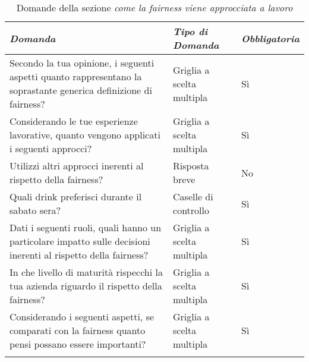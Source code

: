 \begin{longtable}{| p{} | p{} | p{} |} 
\hline\textbf{\textit{Domanda}} & \textbf{\textit{Tipo di Domanda}} & \textbf{\textit{Obbligatoria}}\\
\hline
\endhead 

\hline 
Secondo la tua opinione, i seguenti aspetti quanto rappresentano la soprastante generica definizione di fairness?

& Griglia a scelta multipla

& Sì 

\\ \hline
\rowcolor{Gray!30}
Considerando le tue esperienze lavorative, quanto vengono applicati i seguenti approcci?

& Griglia a scelta multipla

& Sì 

\\ \hline

Utilizzi altri approcci inerenti al rispetto della fairness?   

&  Risposta breve

& No

\\ \hline
\rowcolor{Gray!30}
Quali drink preferisci durante il sabato sera?

&  Caselle di controllo

& Sì

\\ \hline 
Dati i seguenti ruoli, quali hanno un particolare impatto sulle decisioni inerenti al rispetto della fairness?

& Griglia a scelta multipla

& Sì 

\\ \hline
\rowcolor{Gray!30}
In che livello di maturità rispecchi la tua azienda riguardo il rispetto della fairness?

& Griglia a scelta multipla

& Sì 

\\ \hline
Considerando i seguenti aspetti, se comparati con la fairness quanto pensi possano essere importanti?

& Griglia a scelta multipla

& Sì 

\\ \hline
\caption{Domande della sezione \emph{come la fairness viene approcciata a lavoro}} %
\label{tab:myfirstlongtable}
\end{longtable}

